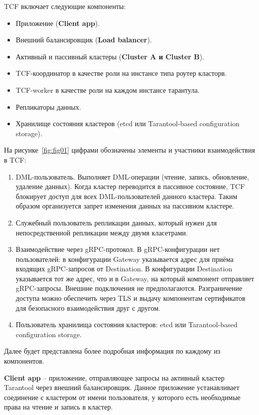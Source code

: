 TCF включает следующие компоненты:

\begin{itemize}
  \item Приложение (\textbf{Client app}).
  \item Внешний балансировщик (\textbf{Load balancer}).
  \item Активный и пассивный кластеры (\textbf{Cluster A и Cluster B}).
  \item TCF-координатор в качестве роли на инстансе типа роутер класторв.
  \item TCF-worker в качестве роли на каждом инстансе тарантула.
  \item Репликаторы данных.
  \item Хранилище состояния кластеров (etcd \cite{etcd} или Tarantool-based configuration storage).
\end{itemize}

На рисунке~\ref{fig:fig01} цифрами обозначены элементы и участники взаимодействия в TCF:

\begin{enumerate}[label=\arabic*.]
  \item DML-пользователь. Выполняет DML-операции (чтение, запись, обновление, удаление данных).
  Когда кластер переводится в пассивное состояние, TCF блокирует доступ для всех DML-пользователей данного
  кластера. Таким образом организуется запрет изменения данных на пассивном кластере.
  \item Служебный пользователь репликации данных, который нужен для непосредственной репликации между двумя
  класетрами.
  \item Взаимодействие через gRPC-протокол. В gRPC-конфигурации нет пользователей: в конфигурации Gateway
  указывается адрес для приёма входящих gRPC-запросов от Destination. В конфигурации Destination указывается
  тот же адрес, что и в Gateway, на который компонент отправляет gRPC-запросы. Внешние подключения не
  предполагаются. Разграничение доступа можно обеспечить через TLS и выдачу компонентам сертификатов для
  безопасного взаимодействия друг с другом.
  \item Пользователь хранилища состояния кластеров: etcd или Tarantool-based configuration storage.
\end{enumerate}

Далее будет представлена более подробная информация по каждому из компонентов.

\textbf{Client app} -- приложение, отправляющее запросы на активный кластер Tarantool через внешний балансировщик.
Данное приложение устанавливает соединение с кластером от имени пользователя, у которого есть необходимые
права на чтение и запись в кластер.

